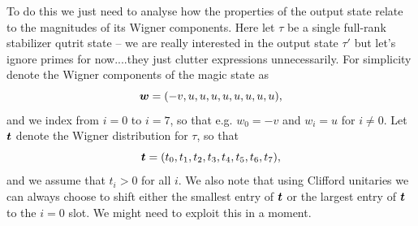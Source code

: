 \documentclass[pra,
aps,
twocolumn,
superscriptaddress,
groupedaddress,
nofootinbib,
reprint
]{revtex4-1}
\begin{document}

To do this we just need to analyse how the properties of the output state relate to the magnitudes of its Wigner components. Here let $\tau$ be a single full-rank stabilizer qutrit state -- we are really interested in the output state $\tau'$ but let's ignore primes for now....they just clutter expressions unnecessarily. For simplicity denote the Wigner components of the magic state as
\begin{equation}
	\boldsymbol{w} = (-v, u,u,u,u,u,u,u,u),
\end{equation}
and we index from $i=0$ to $i=7$, so that e.g. $w_0 = -v$ and $w_i = u$ for $i \ne 0$. Let $\boldsymbol{t}$ denote the Wigner distribution for $\tau$, so that
\begin{equation}
\boldsymbol{t} = (t_0, t_1,t_2, t_3, t_4,t_5,t_6,t_7),
\end{equation}
and we assume that $t_i >0$ for all $i$. We also note that using Clifford unitaries we can always choose to shift either the smallest entry of $\boldsymbol{t}$ or the largest entry of $\boldsymbol{t}$ to the $i=0$ slot. We might need to exploit this in a moment.
\end{document}
